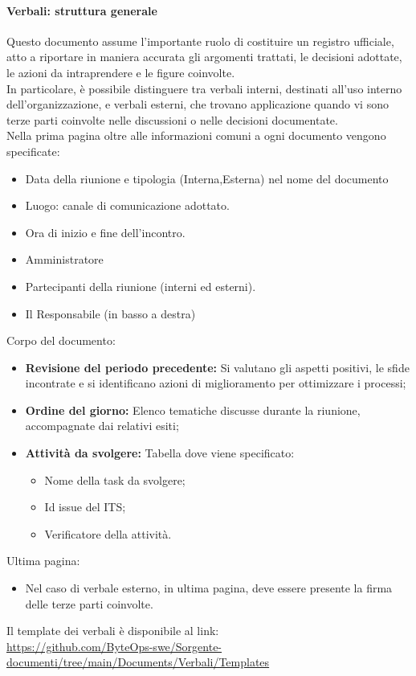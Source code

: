 \documentclass{article}
\begin{document}
\paragraph{Verbali: struttura generale}
Questo documento assume l'importante ruolo di costituire un registro ufficiale, atto a riportare in maniera accurata gli argomenti trattati, le decisioni adottate, le azioni da intraprendere e le figure coinvolte.\\
In particolare, è possibile distinguere tra verbali interni, destinati all'uso interno dell'organizzazione, e verbali esterni, che trovano applicazione quando vi sono terze parti coinvolte nelle discussioni o nelle decisioni documentate.\\ 
Nella prima pagina oltre alle informazioni comuni a ogni documento vengono specificate:
\begin{itemize}
    \item Data della riunione e tipologia (Interna,Esterna) nel nome del documento
    \item Luogo: canale di comunicazione adottato.
    \item Ora di inizio e fine dell'incontro.
    \item Amministratore
    \item Partecipanti della riunione (interni ed esterni).
    \item Il Responsabile (in basso a destra)
\end{itemize}
Corpo del documento:

\begin{itemize}
    \item  \textbf{Revisione del periodo precedente:} Si valutano gli aspetti positivi, le sfide incontrate e si identificano azioni di miglioramento per ottimizzare i processi;
    \item  \textbf{Ordine del giorno:} Elenco tematiche discusse durante la riunione, accompagnate dai relativi esiti;
    \item  \textbf{Attività da svolgere:} Tabella dove viene specificato:
    \begin{itemize}
        \item Nome della task da svolgere;
        \item Id issue del ITS;
        \item Verificatore della attività.
    \end{itemize}
\end{itemize}
    Ultima pagina:
\begin{itemize}
    \item   Nel caso di verbale esterno, in ultima pagina, deve essere presente la firma delle terze parti coinvolte.
\end{itemize}
    Il template dei verbali è disponibile al link:\\ \href{https://github.com/ByteOps-swe/Sorgente-documenti/tree/main/Documents/Verbali/Templates}{https://github.com/ByteOps-swe/Sorgente-documenti/tree/main/Documents/Verbali/Templates}
\end{document}
